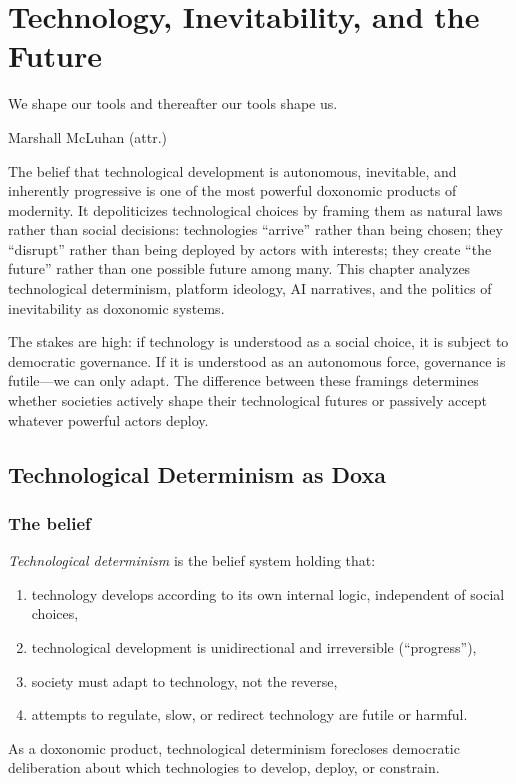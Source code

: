 \chapter{Technology, Inevitability, and the Future}
\label{ch:technology-inevitability}

\epigraph{We shape our tools and thereafter our tools shape us.}{Marshall McLuhan (attr.)}

\noindent
The belief that technological development is autonomous, inevitable, and inherently progressive is one of the most powerful doxonomic products of modernity.
It depoliticizes technological choices by framing them as natural laws rather than social decisions: technologies ``arrive'' rather than being chosen; they ``disrupt'' rather than being deployed by actors with interests; they create ``the future'' rather than one possible future among many.
This chapter analyzes technological determinism, platform ideology, AI narratives, and the politics of inevitability as doxonomic systems.

The stakes are high: if technology is understood as a social choice, it is subject to democratic governance.
If it is understood as an autonomous force, governance is futile---we can only adapt.
The difference between these framings determines whether societies actively shape their technological futures or passively accept whatever powerful actors deploy.

\section{Technological Determinism as Doxa}
\label{sec:ch28-determinism}

\subsection{The belief}

\begin{definition}
\label{def:tech-determinism}
\emph{Technological determinism} is the belief system holding that:
\begin{enumerate}[nosep]
  \item technology develops according to its own internal logic, independent of social choices,
  \item technological development is unidirectional and irreversible (``progress''),
  \item society must adapt to technology, not the reverse,
  \item attempts to regulate, slow, or redirect technology are futile or harmful.
\end{enumerate}
As a doxonomic product, technological determinism forecloses democratic deliberation about which technologies to develop, deploy, or constrain.
\end{definition}

